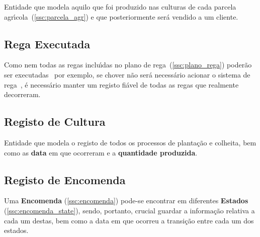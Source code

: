 \documentclass[12pt, a4paper]{article}
\begin{document}
Entidade que modela aquilo que foi produzido nas culturas
de cada parcela agr\'{\i}cola~(\ref{ssc:parcela_agr}) e que posteriormente
ser\'a vendido a um cliente.


\subsection{Rega Executada}\label{ssc:rega_exec}

Como nem todas as regas inclu\'{\i}das no plano de rega~(\ref{ssc:plano_rega}) poder\~ao ser
executadas~{\textemdash} por exemplo, se chover n\~ao ser\'a necess\'ario acionar
o sistema de rega~{\textemdash}, \'e necess\'ario manter um registo fi\'avel de todas
as regas que realmente decorreram.


\subsection{Registo de Cultura}\label{ssc:reg_cult}

Entidade que modela o registo de todos os processos de planta\c{c}\~ao e colheita, bem como
as \textbf{data} em que ocorreram e a \textbf{quantidade produzida}.


\subsection{Registo de Encomenda}\label{ssc:encomenda_reg}

Uma \textbf{Encomenda} (\ref{ssc:encomenda}) pode-se encontrar
em diferentes \textbf{Estados} (\ref{ssc:encomenda_state}),
sendo, portanto, crucial guardar a informa\c{c}\~ao relativa
a cada um destas, bem como a data em que ocorreu a transi\c{c}\~ao
entre cada um dos estados.

\end{document}

